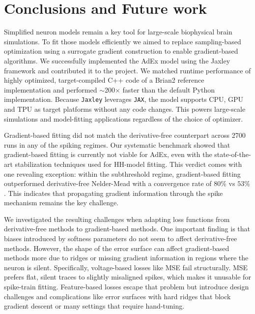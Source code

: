 \section{Conclusions and Future work}\label{ch:conclusionsAndFutureWork}
Simplified neuron models remain a key tool for large-scale biophysical brain simulations.
To fit those models efficiently we aimed to replace sampling-based optimization using a surrogate gradient construction to enable gradient-based algorithms.
We successfully implemented the \gls{AdEx} model using the Jaxley framework and contributed it to the project.
We matched runtime performance of highly optimized, target-compiled C++ code of a Brian2 reference implementation and performed $\sim$200$\times$ faster than the default Python implementation.
Because \texttt{Jaxley} leverages \texttt{JAX}, the model supports CPU, GPU and TPU as target platforms without any code changes.
This powers large-scale simulations and model-fitting applications regardless of the choice of optimizer.

Gradient-based fitting did not match the derivative-free counterpart across 2700 runs in any of the spiking regimes.
Our systematic benchmark showed that gradient-based fitting is currently not viable for \gls{AdEx},
even with the state-of-the-art stabilization techniques used for \gls{HH}-model fitting.
This verdict comes with one revealing exception:
within the subthreshold regime, gradient-based fitting outperformed derivative-free Nelder-Mead with a convergence rate of $80\%$ vs $53\%$.
This indicates that propagating gradient information through the spike mechanism remains the key challenge.

We investigated the resulting challenges when adapting loss functions from derivative-free methods to gradient-based methods.
One important finding is that biases introduced by softness parameters do not seem to affect derivative-free methods.
However, the shape of the error surface can affect gradient-based methods more due to ridges or missing gradient information in regions where the neuron is silent.
Specifically, voltage-based losses like \gls{MSE} fail structurally.
MSE prefers flat, silent traces to slightly misaligned spikes, which makes it unusable for spike-train fitting.
Feature-based losses escape that problem but introduce design challenges and complications like error surfaces with hard ridges that block gradient descent or many settings that require hand-tuning.

